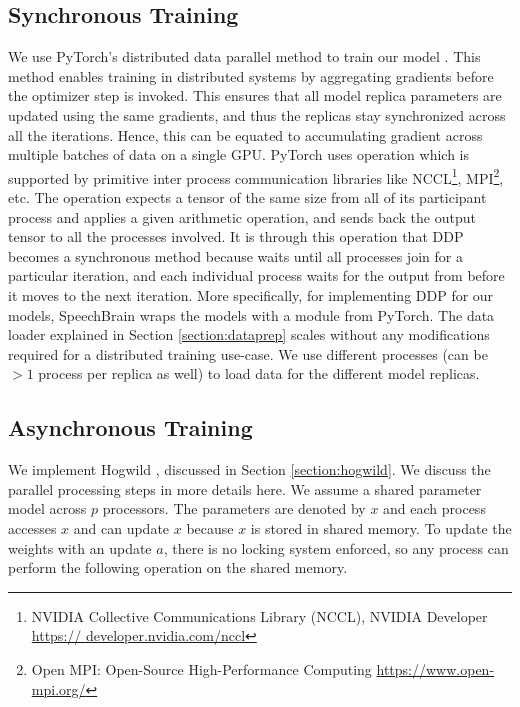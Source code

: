 \subsection{Synchronous Training}
We use PyTorch's distributed data parallel method to train our model \cite{Li2020PyTorchTraining}. This method enables training in distributed systems by aggregating gradients before the optimizer step is invoked. This ensures that all model replica parameters are updated using the same gradients, and thus the replicas stay synchronized across all the iterations. Hence, this can be equated to accumulating gradient across multiple batches of data on a single GPU. PyTorch uses  operation which is supported by primitive inter process communication libraries like NCCL\footnote{NVIDIA Collective Communications Library (NCCL), NVIDIA Developer \href{https://developer.nvidia.com/nccl}{https:// developer.nvidia.com/nccl}}, MPI\footnote{Open MPI: Open-Source High-Performance Computing \href{https://www.open-mpi.org/}{https://www.open-mpi.org/}}, etc. The  operation expects a tensor of the same size from all of its participant process and applies a given arithmetic operation, and sends back the output tensor to all the processes involved. It is through this operation that DDP becomes a synchronous method because   waits until all processes join for a particular iteration, and each individual process waits for the output from  before it moves to the next iteration. More specifically, for implementing DDP for our models, SpeechBrain wraps the models with a  module from PyTorch. The data loader explained in Section \ref{section:dataprep} scales without any modifications required for a distributed training use-case. We use different processes (can be $>1$ process per replica as well) to load data for the different model replicas.

\subsection{Asynchronous Training}
We implement Hogwild \cite{Niu2011HOGWILD:Descent}, discussed in Section \ref{section:hogwild}. We discuss the parallel processing steps in more details here. We assume a shared parameter model across $p$ processors. The parameters are denoted by $x$ and each process accesses $x$ and can update $x$ because $x$ is stored in shared memory. To update the weights with an update $a$, there is no locking system enforced, so any process can perform the following operation on the shared memory.

